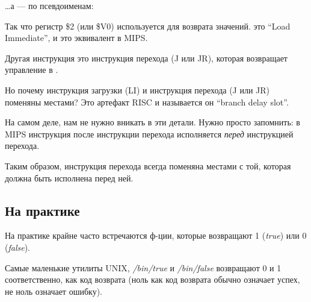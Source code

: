 \dots а \IDA --- по псевдоименам:



Так что регистр \$2 (или \$V0) используется для возврата значений.
 это ``Load Immediate'', и это эквивалент \MOV в MIPS.

Другая инструкция это инструкция перехода (J или JR), которая возвращает управление в .

Но почему инструкция загрузки (LI) и инструкция перехода (J или JR) поменяны местами? Это артефакт \ac{RISC} и называется он ``branch delay slot''.

На самом деле, нам не нужно вникать в эти детали. Нужно просто запомнить: в MIPS инструкция после инструкции перехода исполняется \emph{перед} инструкцией перехода.

Таким образом, инструкция перехода всегда поменяна местами с той, которая должна быть исполнена перед ней.

\subsection{На практике}

На практике крайне часто встречаются ф-ции, которые возвращают 1 (\emph{true}) или 0 (\emph{false}).

Самые маленькие утилиты UNIX, \emph{/bin/true} и \emph{/bin/false} возвращают 0 и 1 соответственно, как код возврата
(ноль как код возврата обычно означает успех, не ноль означает ошибку).

